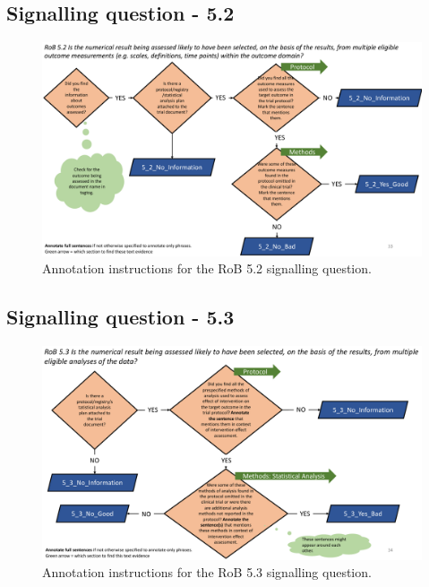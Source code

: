 \documentclass[sn-mathphys,Numbered]{sn-jnl}%
\begin{document}
\subsection*{Signalling question - 5.2 }
%
\begin{figure}[htbp]
    \centering
    \includegraphics[width=\textwidth]{figures/5_2.pdf}
    \caption{Annotation instructions for the RoB 5.2 signalling question.}
    \label{fig:5_2}
\end{figure}
%
%
%
\subsection*{Signalling question - 5.3 }
%
\begin{figure}[htbp]
    \centering
    \includegraphics[width=\textwidth]{figures/5_3.pdf}
    \caption{Annotation instructions for the RoB 5.3 signalling question.}
    \label{fig:5_3}
\end{figure}
%
%
%
%
\end{document}

